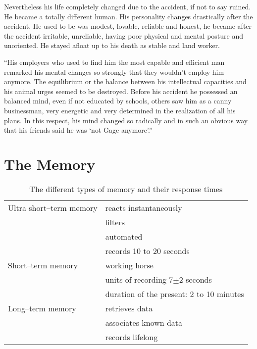 \documentclass[../main.tex]{subfiles}
\begin{document}
{        Nevertheless his life completely changed due to the accident, if not to say ruined. He became a totally different human. His personality changes drastically after the accident. He used to be was modest, lovable, reliable and honest, he became after the accident irritable, unreliable, having poor physical and mental posture and unoriented. He stayed afloat up to his death as stable and land worker.

        ``His employers who used to find him the most capable and efficient man remarked his mental changes so strongly that they wouldn't employ him anymore. The equilibrium or the balance between his intellectual capacities and his animal urges seemed to be destroyed. Before his accident he possessed an balanced mind, even if not educated by schools, others saw him as a canny businessman, very energetic and very determined in the realization of all his plans. In this respect, his mind changed so radically and in such an obvious way that his friends said he was `not Gage anymore'.''
      }

      \chapter{The Memory}
      
      \begin{table}[htb]
        \centering
        \begin{tabular}{ll}
          Ultra short--term memory & reacts instantaneously \\
                                   & filters \\
                                   & automated \\
                                   & records 10 to 20 seconds \\
          Short--term memory       & working horse \\
                                   & units of recording 7$\pm$2 seconds \\
                                   & duration of the present: 2 to 10 minutes \\
          Long--term memory & retrieves data \\
                                   & associates known data \\
          & records lifelong \\
        \end{tabular}
        \caption{The different types of memory and their response times}
      \end{table}
\end{document}
